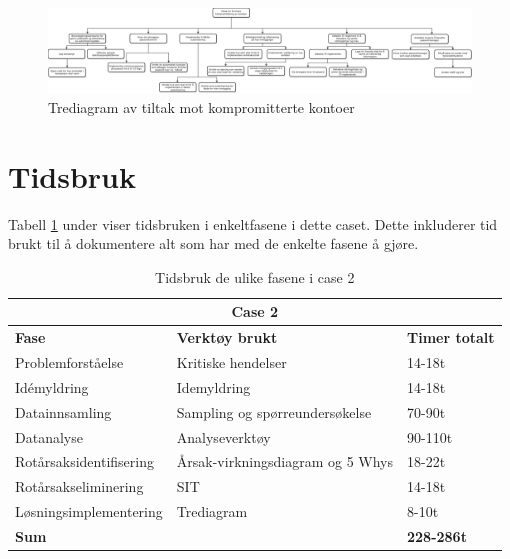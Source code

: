 \begin{figure}[H] 
    \centering    
    \includegraphics[scale=0.4, angle=90]{case_2/bilder/trediagram.pdf}
    \caption[Trediagram av tiltak mot kompromitterte kontoer]{Trediagram av tiltak mot kompromitterte kontoer}
    \label{fig:trediagram-case2}
\end{figure}

\section{Tidsbruk}
Tabell \ref{tab:tidsbruk_case2} under viser tidsbruken i enkeltfasene i dette caset. Dette inkluderer tid brukt til å dokumentere alt som har med de enkelte fasene å gjøre. 

\begin{table}[H]
  \centering
  \caption{Tidsbruk de ulike fasene i case 2}
    \begin{tabular}{|lr|l|}
    \hline
    \multicolumn{3}{|c|}{\cellcolor{yellow}\textbf{Case 2}} \\
    \hline
    \multicolumn{1}{|l|}{\cellcolor{apricot}\textbf{Fase}} & \multicolumn{1}{l|}{\cellcolor{apricot}\textbf{Verktøy brukt}} & \cellcolor{apricot}\textbf{Timer totalt} \\
    \hline
    \multicolumn{1}{|l|}{Problemforståelse} & \multicolumn{1}{l|}{Kritiske hendelser} & 14-18t \\
    \hline
    \multicolumn{1}{|l|}{Idémyldring} & \multicolumn{1}{l|}{Idemyldring} & 14-18t \\
    \hline
    \multicolumn{1}{|l|}{Datainnsamling} & \multicolumn{1}{l|}{Sampling og spørreundersøkelse} & 70-90t \\
    \hline
    \multicolumn{1}{|l|}{Datanalyse} & \multicolumn{1}{l|}{Analyseverktøy} & 90-110t \\
    \hline
    \multicolumn{1}{|l|}{Rotårsaksidentifisering} & \multicolumn{1}{l|}{Årsak-virkningsdiagram og 5 Whys} & 18-22t \\
    \hline
    \multicolumn{1}{|l|}{Rotårsakseliminering} & \multicolumn{1}{l|}{SIT} & 14-18t \\
    \hline
    \multicolumn{1}{|l|}{Løsningsimplementering} & \multicolumn{1}{l|}{Trediagram} & 8-10t \\
    \hline
    \multicolumn{2}{|l|}{\textbf{Sum}} & \textbf{228-286t} \\
    \hline
    \end{tabular}%
  \label{tab:tidsbruk_case2}%
\end{table}%
